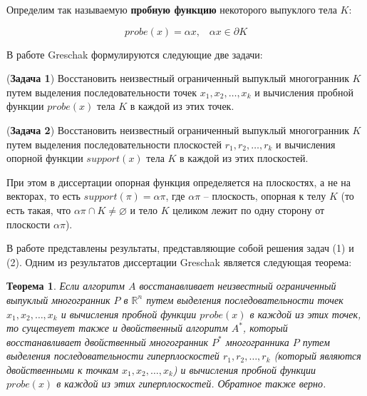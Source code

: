 \documentclass[a4paper, 12pt, titlepage]{article}
\theoremstyle{definition}
\theoremstyle{plain}
\newtheorem{SmartTheorem}{Теорема}
\theoremstyle{plain}
\begin{document}
Определим так называемую \textbf{пробную функцию} некоторого выпуклого тела $K$:

\begin{equation}
 probe(x) = \alpha x, \;\;\; \alpha x \in \partial K
\end{equation}

В работе Greschak формулируются следующие две задачи:

\begin{flushleft}
 (\textbf{Задача 1}) Восстановить неизвестный ограниченный выпуклый
 многогранник $K$ путем выделения последовательности точек
 $x_{1}, x_{2}, \ldots, x_{k}$ и вычисления пробной функции $probe(x)$ тела $K$
 в каждой из этих точек.
\end{flushleft}

\begin{flushleft}
 (\textbf{Задача 2}) Восстановить неизвестный ограниченный выпуклый
 многогранник $K$ путем выделения последовательности плоскостей
 $r_{1}, r_{2}, \ldots, r_{k}$ и вычисления опорной функции $support(x)$ тела
 $K$ в каждой из этих плоскостей.
\end{flushleft}

При этом в диссертации опорная функция определяется на плоскостях, а не на
векторах, то есть $support(\pi) = \alpha \pi$, где $\alpha \pi$ -- плоскость,
опорная к телу $K$ (то есть такая, что $\alpha \pi \cap K \neq \varnothing$ и
тело $K$ целиком лежит по одну сторону от плоскости $\alpha \pi$).

В работе представлены результаты, представляющие собой решения задач (1) и 
(2). Одним из результатов диссертации Greschak является следующая теорема:

\begin{SmartTheorem}
 Если алгоритм $A$ восстанавливает неизвестный ограниченный выпуклый 
 многогранник $P$ в $\mathbb{R}^{n}$ путем выделения последовательности точек
 $x_{1}, x_{2}, \ldots, x_{k}$ и вычисления пробной функции $probe(x)$ в каждой 
 из этих точек, то существует также и двойственный алгоритм $A^{*}$, который
 восстанавливает двойственный многогранник $P^{*}$ многогранника $P$ путем
 выделения последовательности гиперплоскостей $r_{1}, r_{2}, \ldots, r_{k}$
 (который являются двойственными к точкам $x_{1}, x_{2}, \ldots, x_{k}$)
 и вычисления пробной функции $probe(x)$ в каждой из этих гиперплоскостей.
 Обратное также верно.
\end{SmartTheorem}



\end{document}

